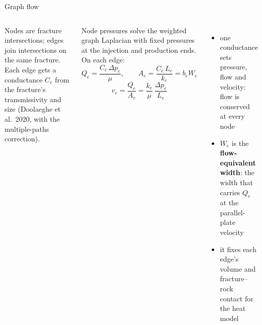 \documentclass[aspectratio=169,10pt]{beamer}
\begin{document}
\begin{frame}{Graph flow}
\begin{columns}[T]
Nodes are fracture intersections; edges join intersections on the same fracture. Each edge gets a conductance $C_e$ from the fracture's transmissivity and size (Doolaeghe et al.\ 2020, with the multiple-paths correction).

\medskip
Node pressures solve the weighted graph Laplacian with fixed pressures at the injection and production ends. On each edge:
\[ Q_e = \frac{C_e\,\Delta p_e}{\mu}, \qquad A_e = \frac{C_e\,L_e}{k_e} = b_e W_e \]
\[ v_e = \frac{Q_e}{A_e} = \frac{k_e}{\mu}\,\frac{\Delta p_e}{L_e} \]
\begin{itemize}
  \item one conductance sets pressure, flow and velocity: flow is conserved at every node
  \item $W_e$ is the \textbf{flow-equivalent width}: the width that carries $Q_e$ at the parallel-plate velocity
  \item it fixes each edge's volume and fracture--rock contact for the heat model
\end{itemize}
\end{columns}
\end{frame}
\end{document}
